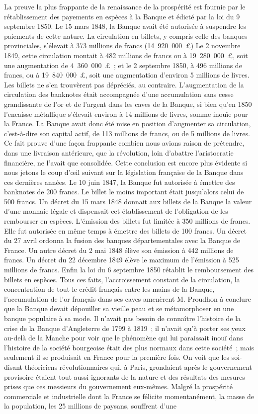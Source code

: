 \documentclass[twoside]{book} %
\begin{document}
La preuve la plus frappante de la renaissance de la prospérité est fournie par le rétablissement des payements en espèces à la Banque et édicté par la loi du 9 septembre 1850. Le 15 mars 1848, la Banque avait été autorisée à suspendre les paiements de cette nature. La circulation en billets, y compris celle des banques provinciales, s’élevait à 373 millions de francs (14 920 000 £) Le 2 novembre 1849, cette circulation montait à 482 millions de francs ou à 19 280 000 £, soit une augmentation de 4 360 000 £ ; et le 2 septembre 1850, à 496 millions de francs, ou à 19 840 000 £, soit une augmentation d’environ 5 millions de livres. Les billets ne s’en trouvèrent pas dépréciés, au contraire. L’augmentation de la circulation des banknotes était accompagnée d’une accumulation sans cesse grandissante de l’or et de l’argent dans les caves de la Banque, si bien qu’en 1850 l’encaisse métallique s’élevait environ à 14 millions de livres, somme inouïe pour la France. La Banque avait donc été mise en position d’augmenter sa circulation, c’est-à-dire son capital actif, de 113 millions de francs, ou de 5 millions de livres. Ce fait prouve d’une façon frappante combien nous avions raison de prétendre, dans une livraison antérieure, que la révolution, loin d’abattre l’aristocratie financière, ne l’avait que consolidée. Cette conclusion est encore plus évidente si nous jetons le coup d’œil suivant sur la législation française de la Banque dans ces dernières années. Le 10 juin 1847, la Banque fut autorisée à émettre des banknotes de 200 francs. Le billet le moins important était jusqu’alors celui de 500 francs. Un décret du 15 mars 1848 donnait aux billets de la Banque la valeur d’une monnaie légale et dispensait cet établissement de l’obligation de les rembourser en espèces. L’émission des billets fut limitée à 350 millions de francs. Elle fut autorisée en même temps à émettre des billets de 100 francs. Un décret du 27 avril ordonna la fusion des banques départementales avec la Banque de France. Un autre décret du 2 mai 1848 élève son émission à 442 millions de francs. Un décret du 22 décembre 1849 élève le maximum de l’émission à 525 millions de francs. Enfin la loi du 6 septembre 1850 rétablit le remboursement des billets en espèces. Tous ces faits, l’accroissement constant de la circulation, la concentration de tout le crédit français entre les mains de la Banque, l’accumulation de l’or français dans ses caves amenèrent M. Proudhon à conclure que la Banque devait dépouiller sa vieille peau et se métamorphoser en une banque populaire à sa mode. Il n’avait pas besoin de connaître l’histoire de la crise de la Banque d’Angleterre de 1799 à 1819 ; il n’avait qu’à porter ses yeux au-delà de la Manche pour voir que le phénomène qui lui paraissait inouï dans l’histoire de la société bourgeoise était des plus normaux dans cette société ; mais seulement il se produisait en France pour la première fois. On voit que les soi-disant théoriciens révolutionnaires qui, à Paris, grondaient après le gouvernement provisoire étaient tout aussi ignorants de la nature et des résultats des mesures prises que ces messieurs du gouvernement eux-mêmes. Malgré la prospérité commerciale et industrielle dont la France se félicite momentanément, la masse de la population, les 25 millions de paysans, souffrent d’une 
\end{document}
